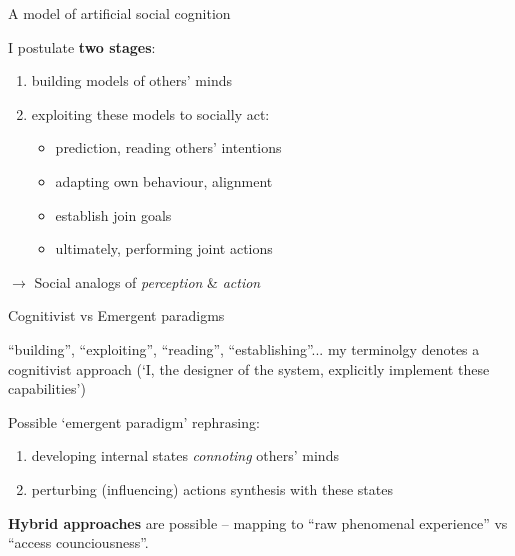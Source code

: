 \documentclass[compress]{beamer}
\begin{document}
\begin{frame}{A model of artificial social cognition}

    I postulate {\bf two stages}:

    \begin{enumerate}
        \item building models of others' minds
        \item exploiting these models to socially act:
            \begin{itemize}
                \item prediction, reading others' intentions
                \item adapting own behaviour, alignment
                \item establish join goals
                \item ultimately, performing joint actions
            \end{itemize}
    \end{enumerate}

    \vspace{2em}
    $\rightarrow$ Social analogs of \emph{perception} \& \emph{action}

\end{frame}


{
\begin{frame}{Cognitivist vs Emergent paradigms}

    ``building'', ``exploiting'', ``reading'', ``establishing''... my terminolgy
    denotes a cognitivist approach (`I, the designer of the system, explicitly implement
    these capabilities')

    \pause
    
    Possible `emergent paradigm' rephrasing:

    \begin{enumerate}
        \item developing internal states \emph{connoting} others' minds
        \item perturbing (influencing) actions synthesis with these states
    \end{enumerate}

    \pause

    {\bf Hybrid approaches} are possible -- mapping to ``raw phenomenal experience'' vs
    ``access counciousness''.
\end{frame}
}
\end{document}
